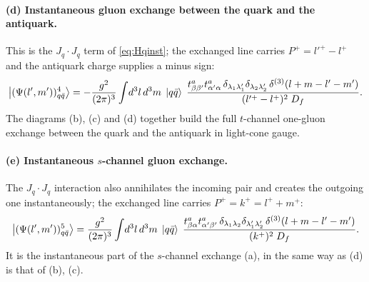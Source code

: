\paragraph{(d) Instantaneous gluon exchange between the quark and the antiquark.}
\begin{center}
\end{center}
This is the $J_{q}\cdot J_{q}$ term of \eqref{eq:Hqinst}; the exchanged line carries
$P^{+}=l'^{+}-l^{+}$ and the antiquark charge supplies a minus sign:
\begin{equation}
\left|(\Psi(l',m'))^{4}_{q\bar q}\right\rangle=-\frac{g^{2}}{(2\pi)^{3}}\int\!d^{3}l\,d^{3}m\;\left|q\bar q\right\rangle\;
\frac{t^{a}_{\beta\beta'}t^{a}_{\alpha'\alpha}\,\delta_{\lambda_{1}\lambda_{1}'}\delta_{\lambda_{2}\lambda_{2}'}\,
\delta^{(3)}(l+m-l'-m')}{(l'^{+}-l^{+})^{2}\;D_{f}} .
\label{eq:D3d}
\end{equation}
The diagrams (b), (c) and (d) together build the full $t$-channel one-gluon exchange between the
quark and the antiquark in light-cone gauge.

\paragraph{(e) Instantaneous $s$-channel gluon exchange.}
\begin{center}
\end{center}
The $J_{q}\cdot J_{q}$ interaction also annihilates the incoming pair and creates the outgoing one
instantaneously; the exchanged line carries $P^{+}=k^{+}=l^{+}+m^{+}$:
\begin{equation}
\left|(\Psi(l',m'))^{5}_{q\bar q}\right\rangle=\frac{g^{2}}{(2\pi)^{3}}\int\!d^{3}l\,d^{3}m\;\left|q\bar q\right\rangle\;
\frac{t^{a}_{\beta\alpha}t^{a}_{\alpha'\beta'}\,\delta_{\lambda_{1}\lambda_{2}}\delta_{\lambda_{1}'\lambda_{2}'}\,
\delta^{(3)}(l+m-l'-m')}{(k^{+})^{2}\;D_{f}} .
\label{eq:D3e}
\end{equation}
It is the instantaneous part of the $s$-channel exchange (a), in the same way as (d) is that of
(b), (c).

